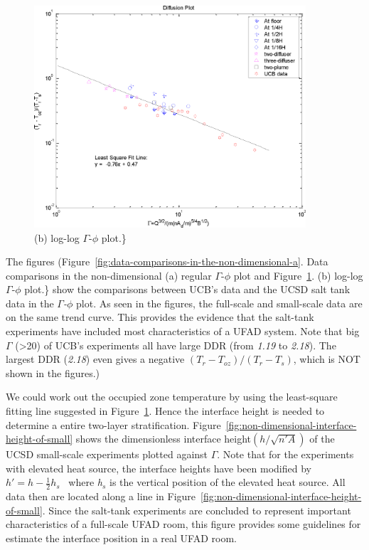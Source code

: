 {\begin{figure}[hbtp] %
\centering
\includegraphics[width=0.9\textwidth, height=0.9\textheight, keepaspectratio=true]{media/image2470.png}
\caption{(b) log-log \(\Gamma\)-\(\phi\) plot.\} \protect \label{fig:b-log-log-g-fplot.}}
\end{figure}

The figures (Figure~\ref{fig:data-comparisons-in-the-non-dimensional-a}. Data comparisons in the non-dimensional (a) regular \(\Gamma\)-\(\phi\) plot and Figure~\ref{fig:b-log-log-g-fplot.}. (b) log-log \(\Gamma\)-\(\phi\) plot.\} show the comparisons between UCB's data and the UCSD salt tank data in the \emph{\(\Gamma\)-\(\phi\)} plot. As seen in the figures, the full-scale and small-scale data are on the same trend curve. This provides the evidence that the salt-tank experiments have included most characteristics of a UFAD system. Note that big \emph{\(\Gamma\)} (\textgreater{}20) of UCB's experiments all have large DDR (from \emph{1.19} to \emph{2.18}). The largest DDR (\emph{2.18}) even gives a negative \(({T_r} - {T_{oz}})/({T_r} - {T_s})\), which is NOT shown in the figures.)

We could work out the occupied zone temperature by using the least-square fitting line suggested in Figure~\ref{fig:b-log-log-g-fplot.}. Hence the interface height is needed to determine a entire two-layer stratification. Figure~\ref{fig:non-dimensional-interface-height-of-small} shows the dimensionless interface height\((h/\sqrt {n'A} )\) of the UCSD small-scale experiments plotted against \emph{\(\Gamma\)}. Note that for the experiments with elevated heat source, the interface heights have been modified by\(h' = h - \frac{1}{2}{h_s}\) ~where \emph{h\(_{s}\)} is the vertical position of the elevated heat source. All data then are located along a line in Figure~\ref{fig:non-dimensional-interface-height-of-small}. Since the salt-tank experiments are concluded to represent important characteristics of a full-scale UFAD room, this figure provides some guidelines for estimate the interface position in a real UFAD room.

}
